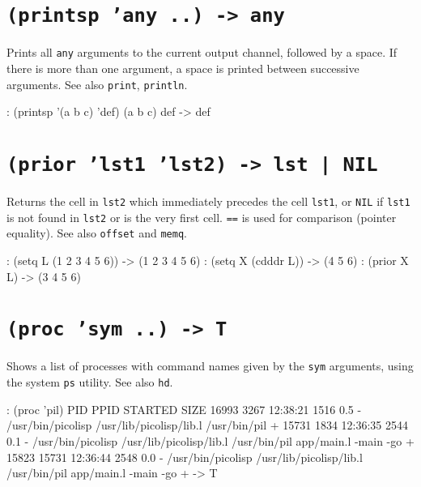  
\section*{\texttt{(printsp 'any ..) -> any}}
\label{sec:func-ref-P-(printsp 'any ..) -> any}


Prints all \texttt{any} arguments to the current output channel, followed by a
space. If there is more than one argument, a space is printed between
successive arguments. See also \texttt{print}, \texttt{println}.


\begin{wideverbatim}
: (printsp '(a b c) 'def)
(a b c) def -> def
\end{wideverbatim}

 
\section*{\texttt{(prior 'lst1 'lst2) -> lst | NIL}}
\label{sec:func-ref-P-(prior 'lst1 'lst2) -> lst | NIL}


Returns the cell in \texttt{lst2} which immediately precedes the cell \texttt{lst1},
or \texttt{NIL} if \texttt{lst1} is not found in \texttt{lst2} or is the very first cell.
\texttt{==} is used for comparison (pointer equality). See also \texttt{offset} and
\texttt{memq}.


\begin{wideverbatim}
: (setq L (1 2 3 4 5 6))
-> (1 2 3 4 5 6)
: (setq X (cdddr L))
-> (4 5 6)
: (prior X L)
-> (3 4 5 6)
\end{wideverbatim}

 
\section*{\texttt{(proc 'sym ..) -> T}}
\label{sec:func-ref-P-(proc 'sym ..) -> T}


Shows a list of processes with command names given by the \texttt{sym}
arguments, using the system \texttt{ps} utility. See also \texttt{hd}.


\begin{wideverbatim}
: (proc 'pil)
  PID  PPID  STARTED  SIZE %
16993  3267 12:38:21  1516  0.5 -      /usr/bin/picolisp /usr/lib/picolisp/lib.l /usr/bin/pil +
15731  1834 12:36:35  2544  0.1 -      /usr/bin/picolisp /usr/lib/picolisp/lib.l /usr/bin/pil app/main.l -main -go +
15823 15731 12:36:44  2548  0.0 -        /usr/bin/picolisp /usr/lib/picolisp/lib.l /usr/bin/pil app/main.l -main -go +
-> T
\end{wideverbatim}

